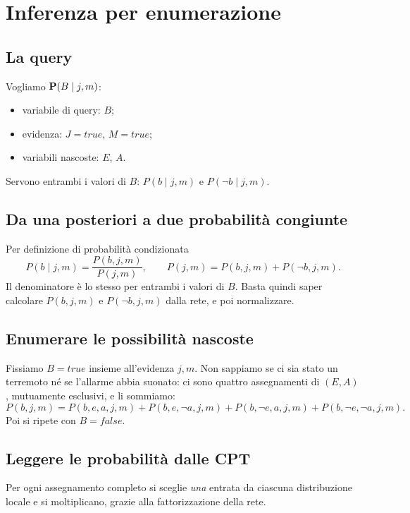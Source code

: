 \section{Inferenza per enumerazione}

\subsection{La query}

Vogliamo $\mathbf{P}(B\mid j,m)$:
\begin{itemize}
  \item variabile di query: $B$;
  \item evidenza: $J=\mathit{true}$, $M=\mathit{true}$;
  \item variabili nascoste: $E$, $A$.
\end{itemize}
Servono entrambi i valori di $B$: $P(b\mid j,m)$ e $P(\neg b\mid j,m)$.

\subsection{Da una posteriori a due probabilità congiunte}

Per definizione di probabilità condizionata
\[
  P(b\mid j,m) = \frac{P(b,j,m)}{P(j,m)},
  \qquad
  P(j,m) = P(b,j,m) + P(\neg b,j,m).
\]
Il denominatore è lo stesso per entrambi i valori di $B$. Basta quindi saper
calcolare $P(b,j,m)$ e $P(\neg b,j,m)$ dalla rete, e poi normalizzare.

\subsection{Enumerare le possibilità nascoste}

Fissiamo $B=\mathit{true}$ insieme all'evidenza $j,m$. Non sappiamo se ci sia
stato un terremoto né se l'allarme abbia suonato: ci sono quattro assegnamenti
di $(E,A)$, mutuamente esclusivi, e li sommiamo:
\[
  P(b,j,m) = P(b,e,a,j,m) + P(b,e,\neg a,j,m) + P(b,\neg e,a,j,m) + P(b,\neg e,\neg a,j,m).
\]
Poi si ripete con $B=\mathit{false}$.

\subsection{Leggere le probabilità dalle CPT}

Per ogni assegnamento completo si sceglie \emph{una} entrata da ciascuna
distribuzione locale e si moltiplicano, grazie alla fattorizzazione della rete.

